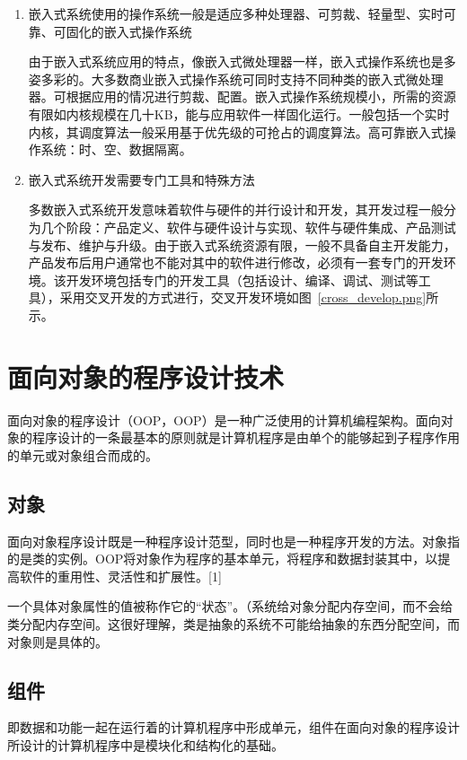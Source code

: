 \begin{enumerate}
\item 嵌入式系统使用的操作系统一般是适应多种处理器、可剪裁、轻量型、实时可靠、可固化的嵌入式操作系统

由于嵌入式系统应用的特点，像嵌入式微处理器一样，嵌入式操作系统也是多姿多彩的。大多数商业嵌入式操作系统可同时支持不同种类的嵌入式微处理器。可根据应用的情况进行剪裁、配置。嵌入式操作系统规模小，所需的资源有限如内核规模在几十KB，能与应用软件一样固化运行。一般包括一个实时内核，其调度算法一般采用基于优先级的可抢占的调度算法。高可靠嵌入式操作系统：时、空、数据隔离。

\item 嵌入式系统开发需要专门工具和特殊方法

多数嵌入式系统开发意味着软件与硬件的并行设计和开发，其开发过程一般分为几个阶段：产品定义、软件与硬件设计与实现、软件与硬件集成、产品测试与发布、维护与升级。由于嵌入式系统资源有限，一般不具备自主开发能力，产品发布后用户通常也不能对其中的软件进行修改，必须有一套专门的开发环境。该开发环境包括专门的开发工具（包括设计、编译、调试、测试等工具），采用交叉开发的方式进行，交叉开发环境如图~\ref{cross_develop.png}所示。
\end{enumerate}

\section{面向对象的程序设计技术}
面向对象的程序设计（\acrlong{OOP}，\acrshort{OOP}）是一种广泛使用的计算机编程架构。面向对象的程序设计的一条最基本的原则就是计算机程序是由单个的能够起到子程序作用的单元或对象组合而成的。

\subsection{对象}
面向对象程序设计既是一种程序设计范型，同时也是一种程序开发的方法。对象指的是类的实例。\acrshort{OOP}将对象作为程序的基本单元，将程序和数据封装其中，以提高软件的重用性、灵活性和扩展性。[1]

一个具体对象属性的值被称作它的“状态”。（系统给对象分配内存空间，而不会给类分配内存空间。这很好理解，类是抽象的系统不可能给抽象的东西分配空间，而对象则是具体的。

\subsection{组件}
即数据和功能一起在运行着的计算机程序中形成单元，组件在面向对象的程序设计所设计的计算机程序中是模块化和结构化的基础。

